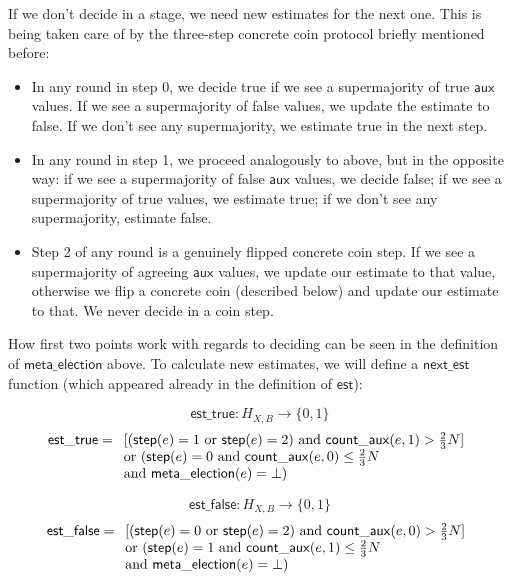 \documentclass[a4paper,fleqn]{article}
\begin{document}
If we don't decide in a stage, we need new estimates for the next one. This is being taken care of
by the three-step concrete coin protocol briefly mentioned before:

\begin{itemize}
	\item In any round in step 0, we decide true if we see a supermajority of true $\mathsf{aux}$
		values. If we see a supermajority of false values, we update the estimate to false. If we
		don't see any supermajority, we estimate true in the next step.
	\item In any round in step 1, we proceed analogously to above, but in the opposite way: if we
		see a supermajority of false $\mathsf{aux}$ values, we decide false; if we see a
		supermajority of true values, we estimate true; if we don't see any supermajority, estimate
		false.
	\item Step 2 of any round is a genuinely flipped concrete coin step. If we see a supermajority
		of agreeing $\mathsf{aux}$ values, we update our estimate to that value, otherwise we flip
		a concrete coin (described below) and update our estimate to that. We never decide in a
		coin step.
\end{itemize}

How first two points work with regards to deciding can be seen in the definition of
$\mathsf{meta\_election}$ above.  To calculate new estimates, we will define a $\mathsf{next\_est}$
function (which appeared already in the definition of $\mathsf{est}$):

\[ \mathsf{est\_true}: H_{X,B} \to \{0,1\} \]
\[ \mathsf{est\_true} = \begin{array}[t]{l}
	\textrm{[($\mathsf{step}(e) = 1$ or $\mathsf{step}(e) = 2$) and $\mathsf{count\_aux}(e, 1) 
		> \frac{2}{3}N$]} \\
	\textrm{or ($\mathsf{step}(e) = 0$ and $\mathsf{count\_aux}(e, 0) \leq \frac{2}{3}N$} \\
	\textrm{and $\mathsf{meta\_election}(e) = \bot$)}
\end{array} \]

\[ \mathsf{est\_false}: H_{X,B} \to \{0,1\} \]
\[ \mathsf{est\_false} = \begin{array}[t]{l}
	\textrm{[($\mathsf{step}(e) = 0$ or $\mathsf{step}(e) = 2$) and $\mathsf{count\_aux}(e, 0) 
		> \frac{2}{3}N$]} \\
	\textrm{or ($\mathsf{step}(e) = 1$ and $\mathsf{count\_aux}(e, 1) \leq \frac{2}{3}N$} \\
	\textrm{and $\mathsf{meta\_election}(e) = \bot$)}
\end{array} \]
\end{document}
